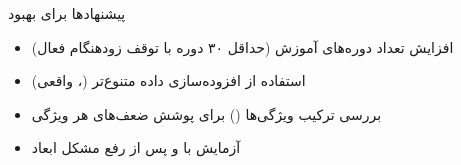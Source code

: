 \documentclass[12pt]{report}
\begin{document}
\begin{genbox}{پیشنهادها برای بهبود}
\begin{itemize}[noitemsep]
    \item افزایش تعداد دوره‌های آموزش (حداقل ۳۰ دوره با توقف زودهنگام فعال)
    \item استفاده از افزوده‌سازی داده متنوع‌تر (،  واقعی)
    \item بررسی ترکیب ویژگی‌ها () برای پوشش ضعف‌های هر ویژگی
    \item آزمایش  با  و  پس از رفع مشکل ابعاد
\end{itemize}
\end{genbox}
\end{document}
